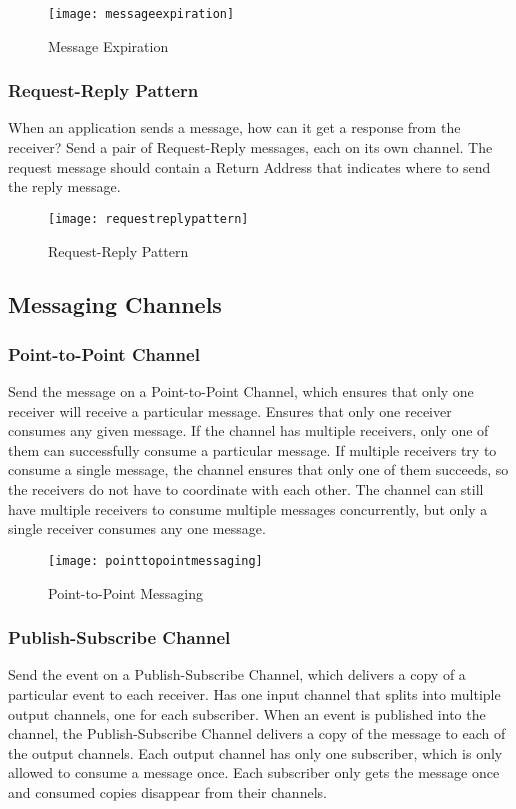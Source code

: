 \begin{figure}[H]
  \center
  \texttt{[image: messageexpiration]}
  \caption{Message Expiration}
\end{figure}

\subsubsection{Request-Reply Pattern}
When an application sends a message, how can it get a response from the receiver? Send a pair of Request-Reply messages, each on its own channel. The request message should contain a Return Address that indicates where to send the reply message.

\begin{figure}[H]
  \center
  \texttt{[image: requestreplypattern]}
  \caption{Request-Reply Pattern}
\end{figure}

\pagebreak

\subsection{Messaging Channels}

\subsubsection{Point-to-Point Channel}
Send the message on a Point-to-Point Channel, which ensures that only one receiver will receive a particular message. Ensures that only one receiver consumes any given message. If the channel has multiple receivers, only one of them can successfully consume a particular message. If multiple receivers try to consume a single message, the channel ensures that only one of them succeeds, so the receivers do not have to coordinate with each other. The channel can still have multiple receivers to consume multiple messages concurrently, but only a single receiver consumes any one message.

\begin{figure}[h!]
  \center
  \texttt{[image: pointtopointmessaging]}
  \caption{Point-to-Point Messaging}
\end{figure}

\subsubsection{Publish-Subscribe Channel}
Send the event on a Publish-Subscribe Channel, which delivers a copy of a particular event to each receiver. Has one input channel that splits into multiple output channels, one for each subscriber. When an event is published into the channel, the Publish-Subscribe Channel delivers a copy of the message to each of the output channels. Each output channel has only one subscriber, which is only allowed to consume a message once. Each subscriber only gets the message once and consumed copies disappear from their channels.


